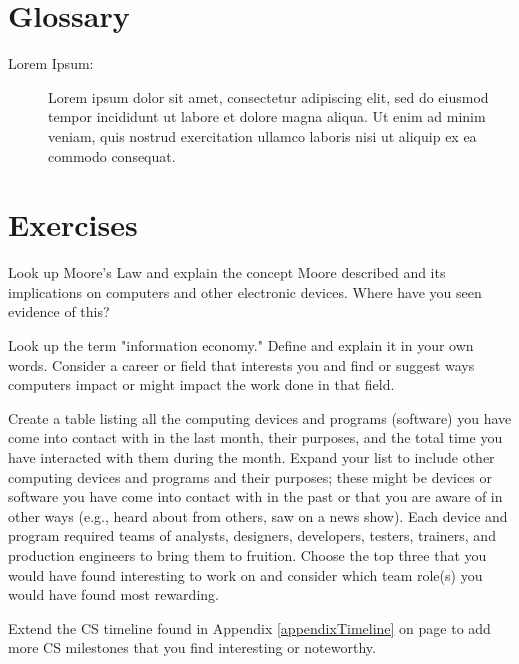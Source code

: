 \section{Glossary}

\begin{description}
	
	\item[Lorem Ipsum:]  Lorem ipsum dolor sit amet, consectetur adipiscing elit, sed do eiusmod tempor incididunt ut labore et dolore magna aliqua. Ut enim ad minim veniam, quis nostrud exercitation ullamco laboris nisi ut aliquip ex ea commodo consequat.
	
\end{description}

\section{Exercises}

\begin{ex}
	Look up Moore's Law and explain the concept Moore described and its implications on computers and other electronic devices. Where have you seen evidence of this?	
\end{ex}

\begin{ex}
	Look up the term "information economy." Define and explain it in your own words. Consider a career or field that interests you and find or suggest ways computers impact or might impact the work done in that field.
\end{ex}

\begin{ex}
	Create a table listing all the computing devices and programs (software) you have come into contact with in the last month, their purposes, and the total time you have interacted with them during the month. Expand your list to include other computing devices and programs and their purposes; these might be devices or software you have come into contact with in the past or that you are aware of in other ways (e.g., heard about from others, saw on a news show). Each device and program required teams of analysts, designers, developers, testers, trainers, and production engineers to bring them to fruition. Choose the top three that you would have found interesting to work on and consider which team role(s) you would have found most rewarding.
	 
\end{ex}

\begin{ex}\label{exCh18Timeline}
	Extend the CS timeline found in Appendix \ref{appendixTimeline} on page \pageref{appendixTimeline} to add more CS milestones that you find interesting or noteworthy.
\end{ex}